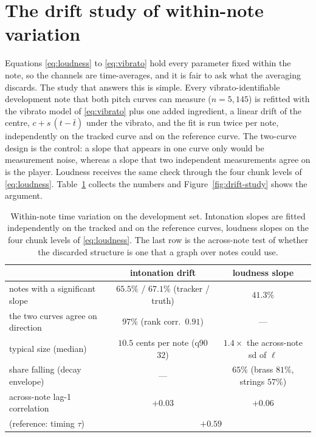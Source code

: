 \section{The drift study of within-note variation}\label{app:drift}
Equations \eqref{eq:loudness} to \eqref{eq:vibrato} hold every parameter
fixed within the note, so the channels are time-averages, and it is fair to
ask what the averaging discards. The study that answers this is simple.
Every vibrato-identifiable development note that both pitch curves can
measure ($n = 5{,}145$) is refitted with the vibrato model of
\eqref{eq:vibrato} plus one added ingredient, a linear drift of the centre,
$c + s\,(t - \bar t)$ under the vibrato, and the fit is run twice per note,
independently on the tracked curve and on the reference curve. The
two-curve design is the control: a slope that appears in one curve only
would be measurement noise, whereas a slope that two independent
measurements agree on is the player. Loudness receives the same check
through the four chunk levels of \eqref{eq:loudness}.
Table~\ref{tab:drift-study} collects the numbers and
Figure~\ref{fig:drift-study} shows the argument.

\begin{table}[t]\centering
\caption{Within-note time variation on the development set. Intonation
slopes are fitted independently on the tracked and on the reference
curves, loudness slopes on the four chunk levels of \eqref{eq:loudness}.
The last row is the across-note test of whether the discarded structure is
one that a graph over notes could use.}
\label{tab:drift-study}
\footnotesize
\begin{tabular}{@{}lcc@{}}
\toprule
 & intonation drift & loudness slope \\
\midrule
notes with a significant slope & $65.5\%$ / $67.1\%$ (tracker / truth) & $41.3\%$ \\
the two curves agree on direction & $97\%$ (rank corr.\ $0.91$) & --- \\
typical size (median) & $10.5$ cents per note (q90 $32$) & $1.4\times$ the across-note sd of $\ell$ \\
share falling (decay envelope) & --- & $65\%$ (brass $81\%$, strings $57\%$) \\
across-note lag-1 correlation & $+0.03$ & $+0.06$ \\
\quad (reference: timing $\tau$) & \multicolumn{2}{c}{$+0.59$} \\
\bottomrule
\end{tabular}
\end{table}

